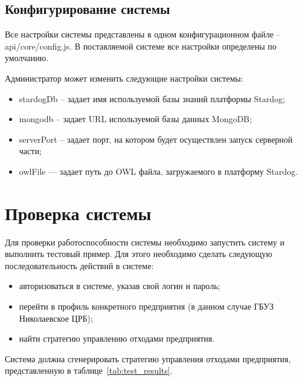 \documentclass[a4paper]{G2-105}
\begin{document}
\section{Конфигурирование системы}

Все настройки системы представлены в одном конфигурационном файле -- api/core/config.js. В поставляемой системе все настройки определены по умолчанию.

Администратор может изменить следующие настройки системы:
\begin{itemize}
\item stardogDb -- задает имя используемой базы знаний платформы Stardog;
\item mongodb -- задает URL используемой базы данных MongoDB;
\item serverPort -- задает порт, на котором будет осуществлен запуск серверной части;
\item owlFile --- задает путь до OWL файла, загружаемого в платформу Stardog.
\end{itemize}

\chapter{Проверка системы}

Для проверки работоспособности системы необходимо запустить систему и выполнить тестовый пример. Для этого необходимо сделать следующую последовательность действий в системе:
\begin{itemize}
\item авторизоваться в системе, указав свой логин и пароль;
\item перейти в профиль конкретного предприятия (в данном случае ГБУЗ Николаевское ЦРБ);
\item найти стратегию управлению отходами предприятия.
\end{itemize}

Система должна сгенерировать стратегию управления отходами предприятия, представленную в таблице~\ref{tab:test_results}.

\clearpage
\end{document}
